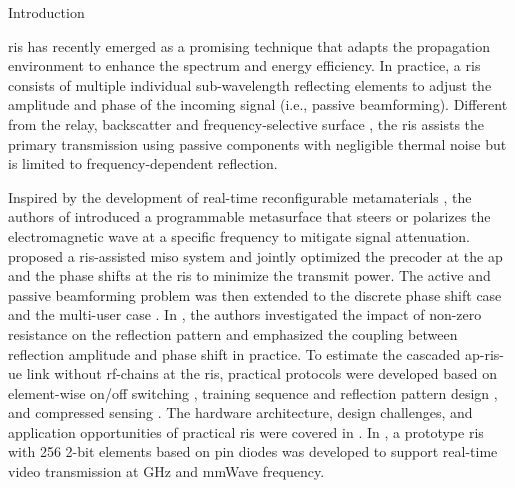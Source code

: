 \begin{section}{Introduction}
\begin{subsection}{}
	\end{subsection}





	\begin{subsection}{}
		\gls{ris} has recently emerged as a promising technique that adapts the propagation environment to enhance the spectrum and energy efficiency. In practice, a \gls{ris} consists of multiple individual sub-wavelength reflecting elements to adjust the amplitude and phase of the incoming signal (i.e., passive beamforming). Different from the relay, backscatter and frequency-selective surface \cite{Anwar2018}, the \gls{ris} assists the primary transmission using passive components with negligible thermal noise but is limited to frequency-dependent reflection.

		Inspired by the development of real-time reconfigurable metamaterials \cite{Cui2014}, the authors of \cite{Liaskos2018} introduced a programmable metasurface that steers or polarizes the electromagnetic wave at a specific frequency to mitigate signal attenuation. \cite{Wu2018} proposed a \gls{ris}-assisted \gls{miso} system and jointly optimized the precoder at the \gls{ap} and the phase shifts at the \gls{ris} to minimize the transmit power. The active and passive beamforming problem was then extended to the discrete phase shift case \cite{Wu2019a} and the multi-user case \cite{Wu2019}. In \cite{Abeywickrama2020}, the authors investigated the impact of non-zero resistance on the reflection pattern and emphasized the coupling between reflection amplitude and phase shift in practice. To estimate the cascaded \gls{ap}-\gls{ris}-\gls{ue} link without \gls{rf}-chains at the \gls{ris}, practical protocols were developed based on element-wise on/off switching \cite{Nadeem2019}, training sequence and reflection pattern design \cite{You2019,Kang2020}, and compressed sensing \cite{Wang2020}. The hardware architecture, design challenges, and application opportunities of practical \gls{ris} were covered in \cite{Wu2020}. In \cite{Dai2020}, a prototype \gls{ris} with \num{256} \num{2}-bit elements based on \gls{pin} diodes was developed to support real-time video transmission at \si{GHz} and mmWave frequency.
	\end{subsection}



\end{section}
